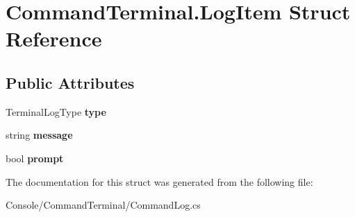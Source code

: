 \hypertarget{struct_command_terminal_1_1_log_item}{}\section{Command\+Terminal.\+Log\+Item Struct Reference}
\label{struct_command_terminal_1_1_log_item}
\subsection*{Public Attributes}
\begin{DoxyCompactItemize}
\item 
\mbox{\label{struct_command_terminal_1_1_log_item_ac983be4b160b4b77ebd4413ae3d9bf15}} 
Terminal\+Log\+Type {\bfseries type}
\item 
\mbox{\label{struct_command_terminal_1_1_log_item_aa6e8325373743db2f9ac2cf18aa646ee}} 
string {\bfseries message}
\item 
\mbox{\label{struct_command_terminal_1_1_log_item_aa308c086e66b9b9a35b1d0066c9370f2}} 
bool {\bfseries prompt}
\end{DoxyCompactItemize}


The documentation for this struct was generated from the following file\+:\begin{DoxyCompactItemize}
\item 
Console/\+Command\+Terminal/Command\+Log.\+cs\end{DoxyCompactItemize}
